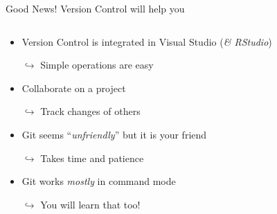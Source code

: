 \documentclass[xcolor=x11names,compress]{beamer}
\renewcommand{\(}{\begin{columns}}
\renewcommand{\)}{\end{columns}}
\newcommand{\<}[1]{\begin{column}{#1}}
\renewcommand{\>}{\end{column}}
\begin{document}
\begin{frame}{Good News! }
Version Control will help you
\pause
\begin{columns}[t]
\begin{column}{0.6\textwidth}
\begin{itemize}[<+->]
        \item Version Control is integrated in Visual Studio (\emph{\& RStudio})
        \item[$\hookrightarrow$] Simple operations are easy
        \item Collaborate on a project
        \item[$\hookrightarrow$] Track changes of others
        \item Git seems  ``\emph{unfriendly}'' but it is your friend
        \item[$\hookrightarrow$] Takes time and patience
        \item Git works \emph{mostly } in command mode
        \item[$\hookrightarrow$] You will learn that too!
    \end{itemize}
 \end{column}
  \begin{column}{0.4\textwidth}
    \begin{center}
    \begin{itemize}

\end{itemize}
\end{center}
\end{column}
\end{columns}
\end{frame}
\end{document}
